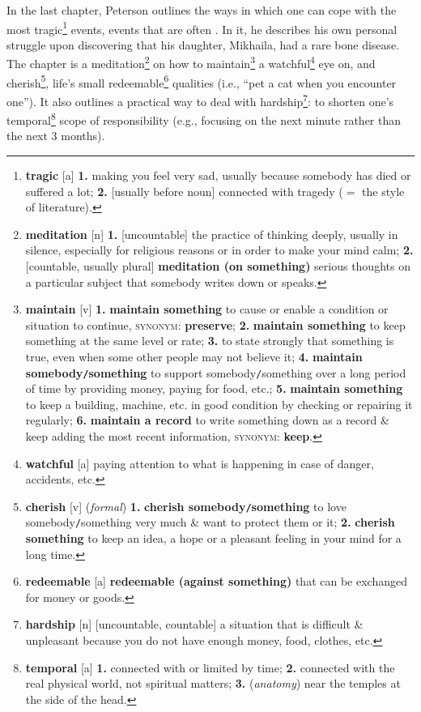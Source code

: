 \documentclass[oneside]{book}
\numberwithin{equation}{section}
\begin{document}
In the last chapter, Peterson outlines the ways in which one can cope with the most tragic\footnote{\textbf{tragic} [a] \textbf{1.} making you feel very sad, usually because somebody has died or suffered a lot; \textbf{2.} [usually before noun] connected with tragedy ($=$ the style of literature).} events, events that are often . In it, he describes his own personal struggle upon discovering that his daughter, Mikhaila, had a rare bone disease. The chapter is a meditation\footnote{\textbf{meditation} [n] \textbf{1.} [uncountable] the practice of thinking deeply, usually in silence, especially for religious reasons or in order to make your mind calm; \textbf{2.} [countable, usually plural] \textbf{meditation (on something)} serious thoughts on a particular subject that somebody writes down or speaks.} on how to maintain\footnote{\textbf{maintain} [v] \textbf{1.} \textbf{maintain something} to cause or enable a condition or situation to continue, \textsc{synonym}: \textbf{preserve}; \textbf{2.} \textbf{maintain something} to keep something at the same level or rate; \textbf{3.} to state strongly that something is true, even when some other people may not believe it; \textbf{4.} \textbf{maintain somebody\texttt{/}something} to support somebody\texttt{/}something over a long period of time by providing money, paying for food, etc.; \textbf{5.} \textbf{maintain something} to keep a building, machine, etc. in good condition by checking or repairing it regularly; \textbf{6.} \textbf{maintain a record} to write something down as a record \& keep adding the most recent information, \textsc{synonym}: \textbf{keep}.} a watchful\footnote{\textbf{watchful} [a] paying attention to what is happening in case of danger, accidents, etc.} eye on, and cherish\footnote{\textbf{cherish} [v] (\textit{formal}) \textbf{1.} \textbf{cherish somebody\texttt{/}something} to love somebody\texttt{/}something very much \& want to protect them or it; \textbf{2.} \textbf{cherish something} to keep an idea, a hope or a pleasant feeling in your mind for a long time.}, life's small redeemable\footnote{\textbf{redeemable} [a] \textbf{redeemable (against something)} that can be exchanged for money or goods.} qualities (i.e., ``pet a cat when you encounter one''). It also outlines a practical way to deal with hardship\footnote{\textbf{hardship} [n] [uncountable, countable] a situation that is difficult \& unpleasant because you do not have enough money, food, clothes, etc.}: to shorten one's temporal\footnote{\textbf{temporal} [a] \textbf{1.} connected with or limited by time; \textbf{2.} connected with the real physical world, not spiritual matters; \textbf{3.} (\textit{anatomy}) near the temples at the side of the head.} scope of responsibility (e.g., focusing on the next minute rather than the next 3 months).
\end{document}
